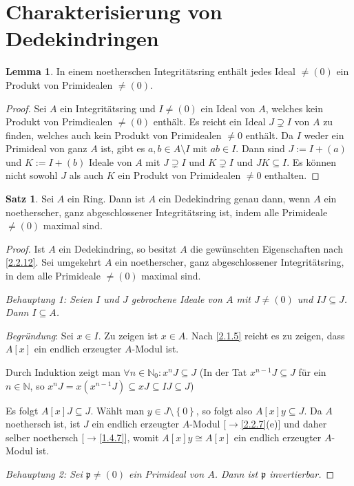 \documentclass[
twoside=semi,
fontsize=12,
DIV=12, 
cleardoublepage=current,
leqno,
headings=optiontoheadandtoc, 
toc=idx
]{scrbook}
\newcommand{\N}{\mathbb{N}}
\newcommand{\set}[1]{\left\{ #1 \right\}}
\theoremstyle{definition}
\newtheorem{satz}[definition]{Satz}
\newtheorem{lemma}[definition]{Lemma}
\begin{document}
 	\section{Charakterisierung von Dedekindringen}
 	\begin{lemma}\label{2.3.1}
 		In einem noetherschen Integrit\"atsring enth\"alt jedes Ideal $\neq (0)$ ein Produkt von Primidealen $\neq (0)$.
 			
 		\begin{proof}
 			Sei $A$ ein Integrit\"atsring und $I \neq (0)$ ein Ideal von $A$, welches kein Produkt von Primdiealen $\neq (0)$ enth\"alt. Es reicht ein Ideal $J \supsetneq I$ von $A$ zu finden, welches auch kein Produkt von Primidealen $\neq 0$ enth\"alt. Da $I$ weder ein Primideal von ganz $A$ ist, gibt es $a,b \in A\setminus I$ mit $ab \in I$. Dann sind $J := I + (a)$ und $K:= I+(b)$ Ideale von $A$ mit $J \supsetneq I$ und $K \supsetneq I$ und $JK \subseteq I$. Es k\"onnen nicht sowohl $J$ als auch $K$ ein Produkt von Primidealen $\neq 0$ enthalten.
 		\end{proof} 
 	\end{lemma}
   	
   	\begin{satz}\label{2.3.2}
   		Sei $A$ ein Ring. Dann ist $A$ ein Dedekindring genau dann, wenn $A$ ein noetherscher, ganz abgeschlossener Integrit\"atsring ist, indem alle Primideale $\neq (0)$ maximal sind.
   			
   		\begin{proof}
   			Ist $A$ ein Dedekindring, so besitzt $A$ die gew\"unschten Eigenschaften nach \ref{2.2.12}. Sei umgekehrt $A$ ein noetherscher, ganz abgeschlossener Integrit\"atsring, in dem alle Primideale $\neq (0)$ maximal sind.
   				
   			\emph{Behauptung 1: Seien $I$ und $J$ gebrochene Ideale von $A$ mit $J \neq (0)$ und $IJ \subseteq J$. Dann $I \subseteq A$.}
   				
   			\emph{Begr\"undung}: Sei $x \in I$. Zu zeigen ist $x \in A$. Nach \ref{2.1.5} reicht es zu zeigen, dass $A[x]$ ein endlich erzeugter $A$-Modul ist. 
   				
   			Durch Induktion zeigt man $\forall n \in \N_0: x^nJ \subseteq J$  (In der Tat $x^{n-1}J \subseteq J$ f\"ur ein $n\in \N$, so $x^nJ = x(x^{n-1}J) \subseteq xJ \subseteq IJ \subseteq J$)
   				
   			Es folgt $A[x]J \subseteq J$. W\"ahlt man $y \in J \setminus \set{0}$, so folgt also $A[x]y \subseteq J$. Da $A$ noethersch ist, ist $J$ ein endlich erzeugter $A$-Modul [$\to$\ref{2.2.7}(e)] und daher selber noethersch [$\to$\ref{1.4.7}], womit $A[x]y \cong A[x]$ ein endlich erzeugter $A$-Modul ist.
   				
   			\vspace*{2mm}
   			\emph{Behauptung 2: Sei $\mathfrak{p} \neq (0)$ ein Primideal von $A$. Dann ist $\mathfrak{p}$ invertierbar.}
   		\end{proof}
   	\end{satz}
   	\newpage
   	
\end{document}
